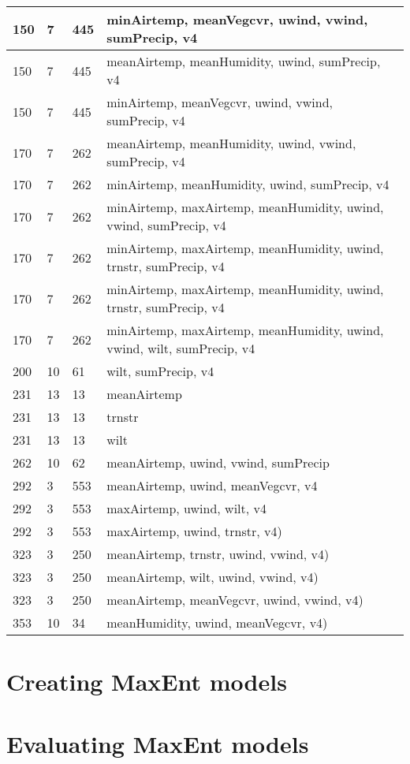 \begin{longtable}{ |p{3cm}||p{3cm}|p{3cm}|p{3cm}|  }
 \hline
 150 & 7  & 445 & minAirtemp, meanVegcvr, uwind, vwind, sumPrecip, v4\\
 \hline
150 & 7  & 445 & meanAirtemp, meanHumidity, uwind, sumPrecip, v4\\
 \hline
 150 & 7  & 445 & minAirtemp, meanVegcvr, uwind, vwind, sumPrecip, v4\\
  \hline
 170 & 7  & 262 & meanAirtemp, meanHumidity, uwind, vwind, sumPrecip, v4\\
 \hline
 170 & 7  & 262 & minAirtemp, meanHumidity, uwind, sumPrecip, v4\\
 \hline
 170 & 7  & 262 & minAirtemp, maxAirtemp, meanHumidity, uwind, vwind, sumPrecip, v4\\
 \hline
  170 & 7  & 262 & minAirtemp, maxAirtemp, meanHumidity, uwind, trnstr, sumPrecip, v4\\
 \hline
   170 & 7  & 262 & minAirtemp, maxAirtemp, meanHumidity, uwind, trnstr, sumPrecip, v4\\
 \hline
   170 & 7  & 262 & minAirtemp, maxAirtemp, meanHumidity, uwind, vwind, wilt, sumPrecip, v4\\
 \hline
    200 & 10  & 61 & wilt, sumPrecip, v4\\
 \hline
     231 & 13  & 13 & meanAirtemp\\
 \hline
      231 & 13  & 13 & trnstr\\
 \hline
      231 & 13  & 13 & wilt\\
 \hline
       262 & 10  & 62 & meanAirtemp, uwind, vwind, sumPrecip\\
 \hline
        292 & 3  & 553 & meanAirtemp, uwind, meanVegcvr, v4\\
 \hline
         292 & 3  & 553 & maxAirtemp, uwind, wilt, v4\\
 \hline
          292 & 3  & 553 & maxAirtemp, uwind, trnstr, v4)\\
 \hline
          323 & 3  & 250 & meanAirtemp, trnstr, uwind, vwind, v4)\\
 \hline
           323 & 3  & 250 & meanAirtemp, wilt, uwind, vwind, v4)\\
 \hline
            323 & 3  & 250 & meanAirtemp, meanVegcvr, uwind, vwind, v4)\\
 \hline
             353 & 10  & 34 & meanHumidity, uwind, meanVegcvr, v4)\\
 \hline
\end{longtable}

\section{Creating MaxEnt models}

\section{Evaluating MaxEnt models}
